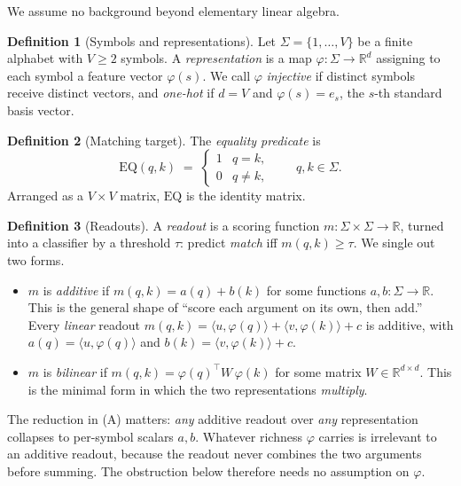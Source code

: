 \documentclass[11pt]{article}
\theoremstyle{plain}
\theoremstyle{definition}
\newtheorem{definition}{Definition}
\theoremstyle{remark}
\newcommand{\Sym}{\Sigma}
\newcommand{\R}{\mathbb{R}}
\newcommand{\EQ}{\mathrm{EQ}}
\newcommand{\inner}[2]{\langle #1, #2 \rangle}
\begin{document}
We assume no background beyond elementary linear algebra.

\begin{definition}[Symbols and representations]
Let $\Sym = \{1,\dots,V\}$ be a finite alphabet with $V \geq 2$ symbols. A \emph{representation} is a map $\varphi : \Sym \to \R^{d}$ assigning to each symbol a feature vector $\varphi(s)$. We call $\varphi$ \emph{injective} if distinct symbols receive distinct vectors, and \emph{one-hot} if $d = V$ and $\varphi(s) = e_{s}$, the $s$-th standard basis vector.
\end{definition}

\begin{definition}[Matching target]
The \emph{equality predicate} is
\[
\EQ(q,k) \;=\;
\begin{cases}
1 & q = k,\\
0 & q \neq k,
\end{cases}
\qquad q,k \in \Sym.
\]
Arranged as a $V \times V$ matrix, $\EQ$ is the identity matrix.
\end{definition}

\begin{definition}[Readouts]
A \emph{readout} is a scoring function $m : \Sym \times \Sym \to \R$, turned into a classifier by a threshold $\tau$: predict \emph{match} iff $m(q,k) \geq \tau$. We single out two forms.
\begin{itemize}
\item[(A)] $m$ is \emph{additive} if $m(q,k) = a(q) + b(k)$ for some functions $a,b : \Sym \to \R$. This is the general shape of ``score each argument on its own, then add.'' Every \emph{linear} readout $m(q,k) = \inner{u}{\varphi(q)} + \inner{v}{\varphi(k)} + c$ is additive, with $a(q) = \inner{u}{\varphi(q)}$ and $b(k) = \inner{v}{\varphi(k)} + c$.
\item[(B)] $m$ is \emph{bilinear} if $m(q,k) = \varphi(q)^{\top} W \, \varphi(k)$ for some matrix $W \in \R^{d \times d}$. This is the minimal form in which the two representations \emph{multiply}.
\end{itemize}
\end{definition}

The reduction in (A) matters: \emph{any} additive readout over \emph{any} representation collapses to per-symbol scalars $a,b$. Whatever richness $\varphi$ carries is irrelevant to an additive readout, because the readout never combines the two arguments before summing. The obstruction below therefore needs no assumption on $\varphi$.
\end{document}
